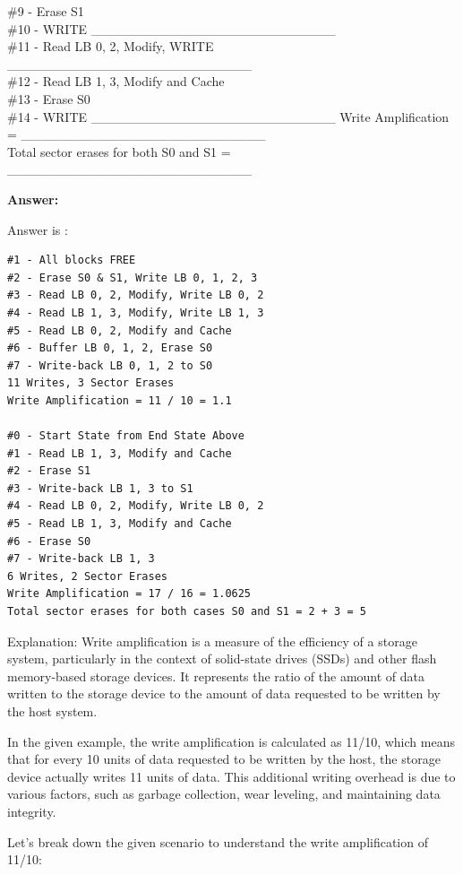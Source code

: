 \documentclass[a4paper,11pt]{article}%
\newenvironment{qanda}{\setlength{\parindent}{0pt}}{\bigskip}
\newcommand{\A}{\par\textbf{Answer: } \normalfont}
\begin{document}
\begin{qanda}
	\#9 - Erase S1\\
	\#10 - WRITE \_\_\_\_\_\_\_\_\_\_\_\_\_\_\_\_\_\_\_\_\_\_\_\_\_\_\\	\#11 - Read LB 0, 2, Modify, WRITE \_\_\_\_\_\_\_\_\_\_\_\_\_\_\_\_\_\_\_\_\_\_\_\_\_\_\\
	\#12 - Read LB 1, 3, Modify and Cache\\
	\#13 - Erase S0\\
	\#14 - WRITE \_\_\_\_\_\_\_\_\_\_\_\_\_\_\_\_\_\_\_\_\_\_\_\_\_\_
	Write Amplification = \_\_\_\_\_\_\_\_\_\_\_\_\_\_\_\_\_\_\_\_\_\_\_\_\_\_\\
	Total sector erases for both S0 and S1 = \_\_\_\_\_\_\_\_\_\_\_\_\_\_\_\_\_\_\_\_\_\_\_\_\_\_\\
	\A

	Answer is :
	\begin{verbatim}
#1 - All blocks FREE
#2 - Erase S0 & S1, Write LB 0, 1, 2, 3
#3 - Read LB 0, 2, Modify, Write LB 0, 2
#4 - Read LB 1, 3, Modify, Write LB 1, 3
#5 - Read LB 0, 2, Modify and Cache
#6 - Buffer LB 0, 1, 2, Erase S0
#7 - Write-back LB 0, 1, 2 to S0
11 Writes, 3 Sector Erases
Write Amplification = 11 / 10 = 1.1

#0 - Start State from End State Above
#1 - Read LB 1, 3, Modify and Cache
#2 - Erase S1
#3 - Write-back LB 1, 3 to S1
#4 - Read LB 0, 2, Modify, Write LB 0, 2
#5 - Read LB 1, 3, Modify and Cache
#6 - Erase S0	
#7 - Write-back LB 1, 3
6 Writes, 2 Sector Erases
Write Amplification = 17 / 16 = 1.0625
Total sector erases for both cases S0 and S1 = 2 + 3 = 5
	\end{verbatim}
	

	Explanation:
	Write amplification is a measure of the efficiency of a storage system, particularly in the context of solid-state drives (SSDs) and other flash memory-based storage devices. It represents the ratio of the amount of data written to the storage device to the amount of data requested to be written by the host system.

In the given example, the write amplification is calculated as 11/10, which means that for every 10 units of data requested to be written by the host, the storage device actually writes 11 units of data. This additional writing overhead is due to various factors, such as garbage collection, wear leveling, and maintaining data integrity.

Let's break down the given scenario to understand the write amplification of 11/10:


\end{qanda}
\end{document}
